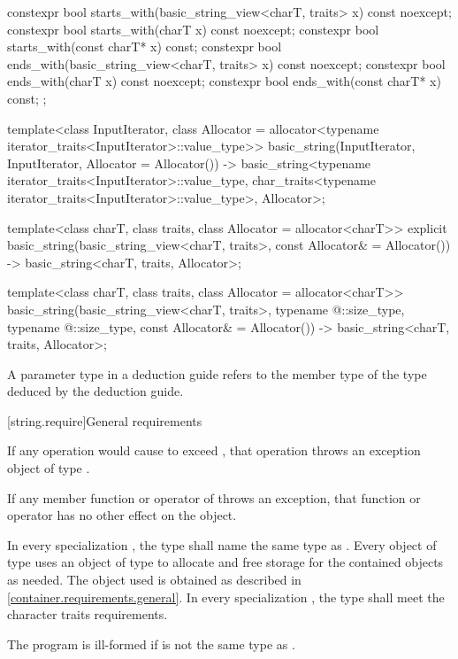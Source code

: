 \begin{codeblock}
{{    constexpr bool starts_with(basic_string_view<charT, traits> x) const noexcept;
    constexpr bool starts_with(charT x) const noexcept;
    constexpr bool starts_with(const charT* x) const;
    constexpr bool ends_with(basic_string_view<charT, traits> x) const noexcept;
    constexpr bool ends_with(charT x) const noexcept;
    constexpr bool ends_with(const charT* x) const;
  };

  template<class InputIterator,
           class Allocator = allocator<typename iterator_traits<InputIterator>::value_type>>
    basic_string(InputIterator, InputIterator, Allocator = Allocator())
      -> basic_string<typename iterator_traits<InputIterator>::value_type,
                      char_traits<typename iterator_traits<InputIterator>::value_type>,
                      Allocator>;

  template<class charT,
           class traits,
           class Allocator = allocator<charT>>
    explicit basic_string(basic_string_view<charT, traits>, const Allocator& = Allocator())
      -> basic_string<charT, traits, Allocator>;

  template<class charT,
           class traits,
           class Allocator = allocator<charT>>
    basic_string(basic_string_view<charT, traits>,
                 typename @\seebelow@::size_type, typename @\seebelow@::size_type,
                 const Allocator& = Allocator())
      -> basic_string<charT, traits, Allocator>;
}
\end{codeblock}

\pnum
A  parameter type in
a  deduction guide
refers to the  member type of
the type deduced by the deduction guide.

[string.require]{General requirements}

\pnum
If any operation would cause  to
exceed , that operation throws an
exception object of type .

\pnum
If any member function or operator of  throws an exception, that
function or operator has no other effect on the  object.

\pnum
In every specialization ,
the type  shall name the same type
as . Every object of type
 uses an object of type
 to allocate and free storage for the contained 
objects as needed. The  object used is
obtained as described in \ref{container.requirements.general}.
In every specialization ,
the type  shall meet
the character traits requirements.
\begin{note}
The program is ill-formed if 
is not the same type as .
\end{note}

